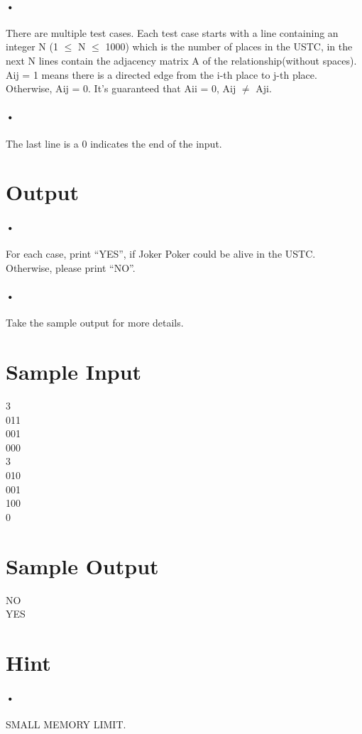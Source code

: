 \documentclass{article}
\begin{document}
	\paragraph*{•}
	
	There are multiple test cases. Each test case starts with a line containing an integer N (1  ${\leq}$ N  ${\leq}$ 1000) which is the number of places in the USTC, in the next N lines contain the adjacency matrix A of the relationship(without spaces). A{ij} = 1 means there is a directed edge from the i-th place to j-th place. Otherwise, A{ij} = 0. It's guaranteed that A{ii} = 0, A{ij} $\neq$ A{ji}.
	\paragraph*{•}
	The last line is a 0 indicates the end of the input. 
	
	\section*{Output}
	\paragraph*{•}
	For each case, print “YES”, if Joker Poker could be alive in the USTC. Otherwise, please print “NO”. 
	\paragraph{•}
	Take the sample output for more details.
	
	\section*{Sample Input}
	3 \\
	011 \\
	001 \\
	000 \\
	3	\\
	010	\\
	001	\\
	100	\\
	0\\
	
	\section*{Sample Output}
	NO\\
	YES\\
	
	\section*{Hint}
	\paragraph*{•}
	SMALL MEMORY LIMIT.
	
	
	
\end{document}
